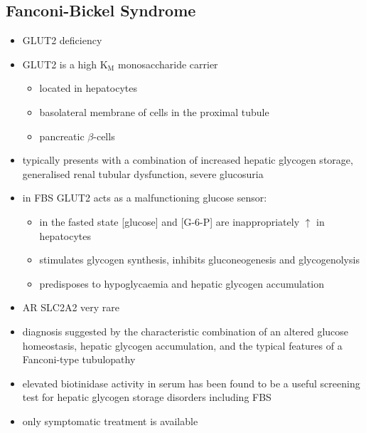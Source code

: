 \documentclass{scrartcl}
\begin{document}
\subsection{Fanconi-Bickel Syndrome}
\label{sec:org9d87de0}
\begin{itemize}
\item GLUT2 deficiency
\item GLUT2 is a high K\(_{\text{M}}\) monosaccharide carrier 
\begin{itemize}
\item located in hepatocytes
\item basolateral membrane of cells in the proximal tubule
\item pancreatic \(\beta\)-cells
\end{itemize}
\item typically presents with a combination of increased hepatic
glycogen storage, generalised renal tubular dysfunction, severe glucosuria
\item in FBS GLUT2 acts as a malfunctioning glucose sensor:
\begin{itemize}
\item in the fasted state [glucose] and [G-6-P] are inappropriately \(\uparrow\) in hepatocytes
\item stimulates glycogen synthesis, inhibits gluconeogenesis and glycogenolysis
\item predisposes to hypoglycaemia and hepatic glycogen accumulation
\end{itemize}
\item AR SLC2A2 very rare
\item diagnosis suggested by the characteristic combination of an altered
glucose homeostasis, hepatic glycogen accumulation, and the typical
features of a Fanconi-type tubulopathy
\item elevated biotinidase activity in serum has been found to be a useful
screening test for hepatic glycogen storage disorders including FBS
\item only symptomatic treatment is available
\end{itemize}
\end{document}

